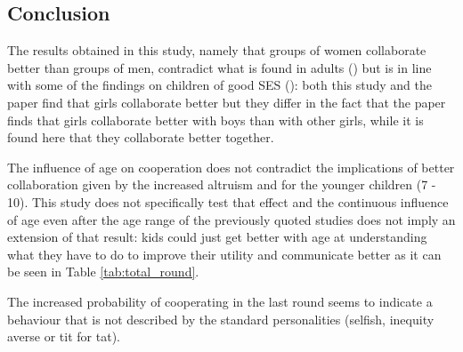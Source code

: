 \documentclass{article} %
\begin{document}

\subsection{Conclusion}

The results obtained in this study, namely that groups of women collaborate better than groups of men, contradict what is found in adults (\cite{balliet}) but is in line with some of the findings on children of good SES (\cite{card}): both this study and the paper find that girls collaborate better but they differ in the fact that the paper finds that girls collaborate better with boys than with other girls, while it is found here that they collaborate better together. 


The influence of age on cooperation does not contradict the implications of better collaboration given by the increased altruism \cite{kogut} and \cite{benen} for the younger children (7 - 10).  This study does not specifically test that effect and the continuous influence of age even after the age range of the previously quoted studies does not imply an extension of that result: kids could just get better with age at understanding what they have to do to improve their utility and communicate better as it can be seen in Table \ref{tab:total_round}.

The increased probability of cooperating in the last round seems to indicate a behaviour that is not described by the standard personalities (selfish, inequity averse or tit for tat).





\end{document}
